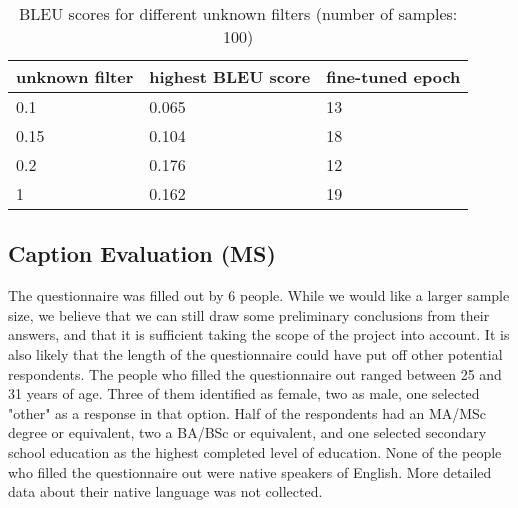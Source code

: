 \documentclass[11pt]{article}
\begin{document}
\begin{table}[h]
    \begin{center}
        \begin{tabular}{|p{1.9cm}|p{2cm}|p{2cm}|}
            \hline \bf unknown filter & \bf highest BLEU score & \bf fine-tuned epoch \\ \hline
            0.1                       & 0.065                  & 13                   \\
            0.15                      & 0.104                  & 18                   \\
            0.2                       & 0.176                  & 12                   \\
            1                         & 0.162                  & 19                   \\
            \hline
        \end{tabular}
    \end{center}
    \caption{\label{BLEU-unknown-filter} BLEU scores for different unknown filters (number of samples: 100) }
\end{table}

\subsection{Caption Evaluation (MS)}

The questionnaire was filled out by 6 people. While we would like a larger sample size, we believe that we can still draw some preliminary conclusions from their answers, and that it is sufficient taking the scope of the project into account. It is also likely that the length of the questionnaire could have put off other potential respondents. The people who filled the questionnaire out ranged between 25 and 31 years of age. Three of them identified as female, two as male, one selected "other" as a response in that option. Half of the respondents had an MA/MSc degree or equivalent, two a BA/BSc or equivalent, and one selected secondary school education as the highest completed level of education. None of the people who filled the questionnaire out were native speakers of English. More detailed data about their native language was not collected.
\end{document}
